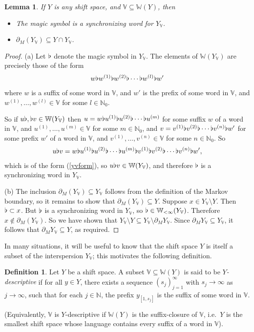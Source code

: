 \documentclass[reqno,11pt]{amsart}
\newtheorem{lem}[thm]{Lemma}
\theoremstyle{definition}
\newtheorem{defn}[thm]{Definition}
\theoremstyle{remark}
\theoremstyle{remark}
\def \N {\mathbb N}
\def\w{\mathbb{W}}
\def\v{\mathbb V}
\def\b{\kern 0.02em \flat \kern 0.02em}
\numberwithin{equation}{section}
\begin{document}
\begin{lem}\label{S(Z)properties} If $Y$ is any shift space, and $\v\subseteq\w(Y)$,
then
\begin{itemize}
\item[(a)]
The magic symbol is a synchronizing word for $Y_\v$.
\item[(b)]
$\partial_M( Y_\v )\subseteq Y \cap  Y_\v$.
\end{itemize}
\end{lem}
\begin{proof}
(a) 
Let $\b$ denote the magic symbol in $Y_{\v}$.
The elements of $\w(Y_\v)$ are precisely those of the form
\begin{equation}\label{yvform}
w\b w^{(1)}\b w^{(2)}\b\cdots \b w^{(l)}\b w'
\end{equation}
where $w$ is a suffix of some word in $\v$, and $w'$ is the prefix of some word in $\v$,
and $w^{(1)},\ldots, w^{(l)}\in\v$ for some $l\in\N_0$.

So if $u\b,\b v\in\w(Y_\v)$ then 
$u=w\b u^{(1)}\b u^{(2)}\b\cdots \b u^{(m)}$ for some suffix $w$ of a word in $\v$,
and $u^{(1)},\ldots, u^{(m)}\in\v$ for some $m\in\N_0$,
and $v=  v^{(1)}\b v^{(2)}\b\cdots \b v^{(n)}\b w'$
for some prefix
$w'$ of a word in $\v$,
and $v^{(1)},\ldots, v^{(n)}\in\v$ for some $n\in\N_0$.
So
$$
u\b v = w\b u^{(1)}\b u^{(2)}\b\cdots \b u^{(m)} \b  v^{(1)}\b v^{(2)}\b\cdots \b v^{(n)}\b w',
$$
which is of the form (\ref{yvform}), so
$u\b v\in\w(Y_\v)$, and therefore $\b$ is a synchronizing word in $Y_\v$.


(b) The inclusion $\partial_M( Y_\v )\subseteq  Y_\v$ follows from the definition of the Markov boundary, so it remains
to show that  $\partial_M( Y_\v )\subseteq  Y$.
Suppose $x\in Y_\v \setminus Y$. Then $\b\subset x$.
But $\b$ is a synchronizing word in $Y_\v$, so $\b\in \w_{<\infty}(Y_\v)$.
Therefore $x\notin \partial_M(Y_\v)$.
So we have shown that $Y_\v\setminus Y \subseteq Y_\v \setminus \partial_M Y_\v$.
Since $\partial_M Y_\v\subseteq Y_\v$, it follows that $\partial_M Y_\v \subseteq Y$, as required.
\end{proof}


In many situations, it will be useful to know that the shift space $Y$ is itself a subset of 
the interspersion $Y_\v$; this motivates the following definition.

\begin{defn}
Let $Y$ be a shift space.
A subset $\v\subseteq\w(Y)$ is said to be \emph{$Y$-descriptive}
if for all $y\in Y$, there exists a sequence $(s_j)_{j=1}^\infty$ with $s_j\to\infty$
as $j\to\infty$, such that for each $j\in\N$, the prefix $y_{[1,s_j]}$ is the suffix of some word in $\v$.

\noindent
(Equivalently, $\v$ is $Y$-descriptive if $\w(Y)$ is the suffix-closure of $\v$, i.e.~$Y$ is the smallest
shift space whose language contains every suffix of a word in $\v$).
\end{defn}
\end{document}
